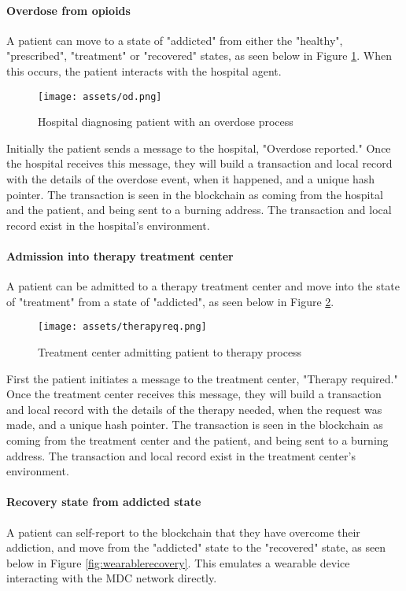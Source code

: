 \documentclass[12pt]{report}
\begin{document}
\paragraph{Overdose from opioids}
A patient can move to a state of "addicted" from either the "healthy", "prescribed", "treatment" or "recovered" states, as seen below in Figure \ref{fig:od}. When this occurs, the patient interacts with the hospital agent.

\begin{figure}[!h]
\texttt{[image: assets/od.png]}
\caption{Hospital diagnosing patient with an overdose process}
\label{fig:od}
\end{figure}

Initially the patient sends a message to the hospital, "Overdose reported." Once the hospital receives this message, they will build a transaction and local record with the details of the overdose event, when it happened, and a unique hash pointer. The transaction is seen in the blockchain as coming from the hospital and the patient, and being sent to a burning address. The transaction and local record exist in the hospital's environment.

\paragraph{Admission into therapy treatment center}
A patient can be admitted to a therapy treatment center and move into the state of "treatment" from a state of "addicted", as seen below in Figure \ref{fig:therapyreq}. 

\begin{figure}[!h]
\texttt{[image: assets/therapyreq.png]}
\caption{Treatment center admitting patient to therapy process}
\label{fig:therapyreq}
\end{figure}

First the patient initiates a message to the treatment center, "Therapy required." Once the treatment center receives this message, they will build a transaction and local record with the details of the therapy needed, when the request was made, and a unique hash pointer. The transaction is seen in the blockchain as coming from the treatment center and the patient, and being sent to a burning address. The transaction and local record exist in the treatment center's environment.

\paragraph{Recovery state from addicted state}
A patient can self-report to the blockchain that they have overcome their addiction, and move from the "addicted" state to the "recovered" state, as seen below in Figure \ref{fig:wearablerecovery}. This emulates a wearable device interacting with the MDC network directly.
\end{document}
